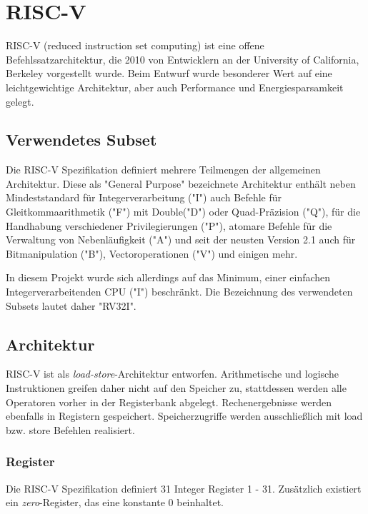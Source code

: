 \chapter{RISC-V} %
\label{RISC-V} %

RISC-V (reduced instruction set computing) ist eine offene Befehlssatzarchitektur, die 2010 von Entwicklern an der University of California, Berkeley vorgestellt wurde. Beim Entwurf wurde besonderer Wert auf eine leichtgewichtige Architektur, aber auch Performance und Energiesparsamkeit gelegt.

\section{Verwendetes Subset}
Die RISC-V Spezifikation definiert mehrere Teilmengen der allgemeinen Architektur. Diese als "General Purpose" bezeichnete Architektur enthält neben Mindeststandard für Integerverarbeitung ("I") auch Befehle für Gleitkommaarithmetik ("F") mit Double("D") oder Quad-Präzision ("Q"), für die Handhabung verschiedener Privilegierungen ("P"), atomare Befehle für die Verwaltung von Nebenläufigkeit ("A") und seit der neusten Version  2.1 auch für Bitmanipulation ("B"), Vectoroperationen ("V") und einigen mehr.

In diesem Projekt wurde sich allerdings auf das Minimum, einer einfachen Integerverarbeitenden CPU ("I") beschränkt. Die Bezeichnung des verwendeten Subsets lautet daher "RV32I".

\section{Architektur}
RISC-V ist als \textit{load-store}-Architektur entworfen. Arithmetische und logische Instruktionen greifen daher nicht auf den Speicher zu, stattdessen werden alle Operatoren vorher in der Registerbank abgelegt. Rechenergebnisse werden ebenfalls in Registern gespeichert. Speicherzugriffe werden ausschließlich mit load bzw. store Befehlen realisiert.

\subsection{Register}
Die RISC-V Spezifikation definiert 31 Integer Register 1 - 31. Zusätzlich existiert ein \textit{zero}-Register, das eine konstante 0 beinhaltet.

